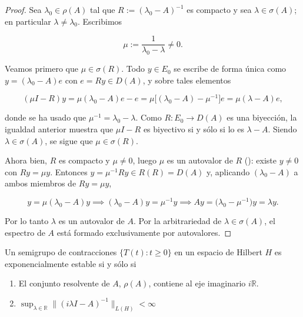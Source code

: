 \begin{proof}
    Sea $\lambda_0 \in \rho(A)$ tal que $R := (\lambda_0 - A)^{-1}$ es compacto y sea $\lambda \in \sigma(A)$; en particular $\lambda \neq \lambda_0$. Escribimos

    \[\mu := \frac{1}{\lambda_0 - \lambda} \neq 0.\]

    Veamos primero que $\mu \in \sigma(R)$. Todo $y \in E_0$ se escribe de forma única como $y = (\lambda_0 - A)e$ con $e = Ry \in D(A)$, y sobre tales elementos

    \[(\mu I - R)y = \mu(\lambda_0 - A)e - e = \mu\Big[(\lambda_0 - A) - \mu^{-1}\Big]e = \mu(\lambda - A)e,\]

    donde se ha usado que $\mu^{-1} = \lambda_0 - \lambda$. Como $R : E_0 \rightarrow D(A)$ es una biyección, la igualdad anterior muestra que $\mu I - R$ es biyectivo si y sólo si lo es $\lambda - A$. Siendo $\lambda \in \sigma(A)$, se sigue que $\mu \in \sigma(R)$.

    Ahora bien, $R$ es compacto y $\mu \neq 0$, luego $\mu$ es un autovalor de $R$ (\cite[Teorema~6.8]{brezis-2011-fun-ana-sob}): existe $y \neq 0$ con $Ry = \mu y$. Entonces $y = \mu^{-1}Ry \in R(R) = D(A)$ y, aplicando $(\lambda_0 - A)$ a ambos miembros de $Ry = \mu y$,

    \[y = \mu(\lambda_0 - A)y \implies (\lambda_0 - A)y = \mu^{-1}y \implies Ay = \big(\lambda_0 - \mu^{-1}\big)y = \lambda y.\]

    Por lo tanto $\lambda$ es un autovalor de $A$. Por la arbitrariedad de $\lambda \in \sigma(A)$, el espectro de $A$ está formado exclusivamente por autovalores.
\end{proof}

\begin{Teorema}
    \label{ch:semigrupos:section:estExp:th:estExpHilbert}

    Un semigrupo de contracciones $\{T(t) : t \geq 0 \}$ en un espacio de Hilbert $H$ es exponencialmente estable si y sólo si

    \begin{enumerate}
        \item El conjunto resolvente de $A$, $\rho(A)$, contiene al eje imaginario $i\mathbb{R}$.

        \item $\displaystyle\sup_{\lambda \in \mathbb{R}}\lVert (i\lambda I - A)^{-1}\rVert_{L(H)} < \infty$
    \end{enumerate}
\end{Teorema}

